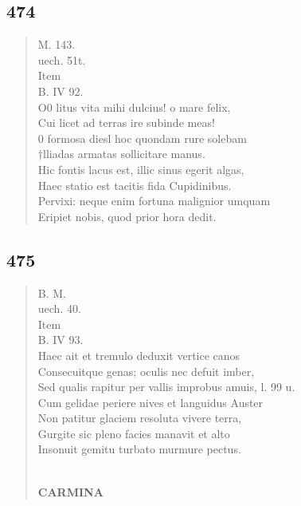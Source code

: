 \documentclass[11pt, a4paper]{report}
\begin{document}
            \subsection*{474}
      \begin{verse}
      M. 143. \\ uech. 51t. \\ Item \\ B. IV 92. \\ O0 litus vita mihi dulcius! o mare felix, \\ Cui licet ad terras ire subinde meas! \\ 0 formosa diesl hoc quondam rure solebam \\ †lliadas armatas sollicitare manus. \\ Hic fontis lacus est, illic sinus egerit algas, \\ Haec statio est tacitis fida Cupidinibus. \\ Pervixi: neque enim fortuna malignior umquam \\ Eripiet nobis, quod prior hora dedit. \\ 
      \end{verse}
  
            \subsection*{475}
      \begin{verse}
      B. M. \\ uech. 40. \\ Item \\ B. IV 93. \\ Haec ait et tremulo deduxit vertice canos \\ Consecuitque genas; oculis nec defuit imber, \\ Sed qualis rapitur per vallis improbus amuis, l. 99 u. \\ Cum gelidae periere nives et languidus Auster \\ Non patitur glaciem resoluta vivere terra, \\ Gurgite sic pleno facies manavit et alto \\ Insonuit gemitu turbato murmure pectus. \\ 
        ﻿\pagebreak 
    \begin{center} \textbf{CARMINA} \end{center} \marginpar{[348]} 
      \end{verse}
  
\end{document}
